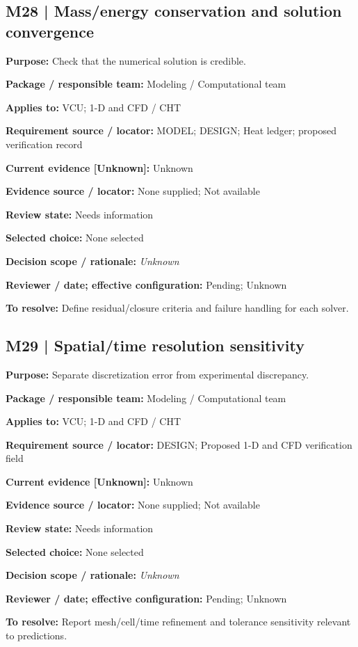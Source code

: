 \documentclass[11pt]{article}
\begin{document}
\par\noindent\begin{minipage}{\textwidth}\small\setlength{\parskip}{2pt}
\subsection*{M28 | Mass/energy conservation and solution convergence}
\textbf{Purpose:} Check that the numerical solution is credible.\par
\textbf{Package / responsible team:} Modeling / Computational team\par
\textbf{Applies to:} VCU; 1-D and CFD / CHT\par
\textbf{Requirement source / locator:} MODEL; DESIGN; Heat ledger; proposed verification record\par
\textbf{Current evidence [Unknown]:} Unknown\par
\textbf{Evidence source / locator:} None supplied; Not available\par
\textbf{Review state:} Needs information\par
\textbf{Selected choice:} None selected\par
\textbf{Decision scope / rationale:} \textit{Unknown}\par
\textbf{Reviewer / date; effective configuration:} Pending; Unknown\par
\textbf{To resolve:} Define residual/closure criteria and failure handling for each solver.\par
\end{minipage}\par\vspace{5pt}
\par\noindent\begin{minipage}{\textwidth}\small\setlength{\parskip}{2pt}
\subsection*{M29 | Spatial/time resolution sensitivity}
\textbf{Purpose:} Separate discretization error from experimental discrepancy.\par
\textbf{Package / responsible team:} Modeling / Computational team\par
\textbf{Applies to:} VCU; 1-D and CFD / CHT\par
\textbf{Requirement source / locator:} DESIGN; Proposed 1-D and CFD verification field\par
\textbf{Current evidence [Unknown]:} Unknown\par
\textbf{Evidence source / locator:} None supplied; Not available\par
\textbf{Review state:} Needs information\par
\textbf{Selected choice:} None selected\par
\textbf{Decision scope / rationale:} \textit{Unknown}\par
\textbf{Reviewer / date; effective configuration:} Pending; Unknown\par
\textbf{To resolve:} Report mesh/cell/time refinement and tolerance sensitivity relevant to predictions.\par
\end{minipage}\par\vspace{5pt}
\end{document}
